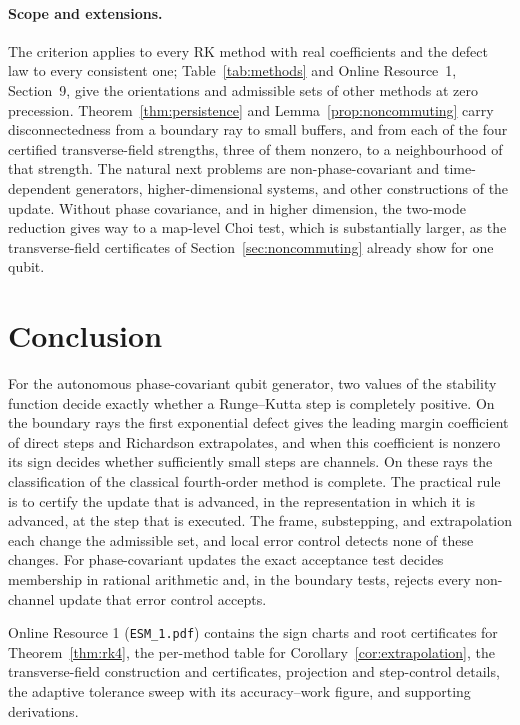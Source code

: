 \documentclass[pdflatex,sn-mathphys-num]{sn-jnl}
\theoremstyle{thmstyleone}
\theoremstyle{thmstylethree}
\theoremstyle{thmstyletwo}
\begin{document}
\paragraph{Scope and extensions.} The criterion applies to every RK method with real coefficients and the defect law to every consistent one; Table~\ref{tab:methods} and Online Resource~1, Section~9, give the orientations and admissible sets of other methods at zero precession. Theorem~\ref{thm:persistence} and Lemma~\ref{prop:noncommuting} carry disconnectedness from a boundary ray to small buffers, and from each of the four certified transverse-field strengths, three of them nonzero, to a neighbourhood of that strength. The natural next problems are non-phase-covariant and time-dependent generators, higher-dimensional systems, and other constructions of the update. Without phase covariance, and in higher dimension, the two-mode reduction gives way to a map-level Choi test, which is substantially larger, as the transverse-field certificates of Section~\ref{sec:noncommuting} already show for one qubit.
\section{Conclusion}\label{sec:conclusion}

For the autonomous phase-covariant qubit generator, two values of the stability function decide exactly whether a Runge\nobreakdash--Kutta step is completely positive. On the boundary rays the first exponential defect gives the leading margin coefficient of direct steps and Richardson extrapolates, and when this coefficient is nonzero its sign decides whether sufficiently small steps are channels. On these rays the classification of the classical fourth-order method is complete. The practical rule is to certify the update that is advanced, in the representation in which it is advanced, at the step that is executed. The frame, substepping, and extrapolation each change the admissible set, and local error control detects none of these changes. For phase-covariant updates the exact acceptance test decides membership in rational arithmetic and, in the boundary tests, rejects every non-channel update that error control accepts.

\backmatter

Online Resource 1 (\texttt{ESM\_1.pdf}) contains the sign charts and root certificates for Theorem~\ref{thm:rk4}, the per-method table for Corollary~\ref{cor:extrapolation}, the transverse-field construction and certificates, projection and step-control details, the adaptive tolerance sweep with its accuracy--work figure, and supporting derivations.
\end{document}
